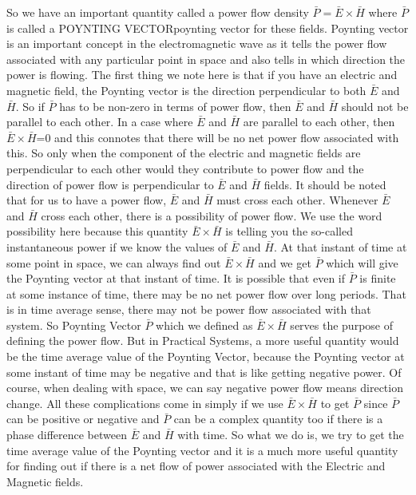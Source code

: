 So we have an important quantity called a power flow density $ \bar{P}=\bar{E}\times\bar{H} $ where $  \bar{P}  $ is called a POYNTING VECTORpoynting vector for these fields. Poynting vector is an important concept in the electromagnetic wave as it tells the power flow associated with any particular point in space and also tells in which direction the power is flowing. The first thing we note here is that if you have an electric and magnetic field, the Poynting vector is the direction perpendicular to both $ \bar{E} $ and  $ \bar{H} $. So if $  \bar{P}  $  has to be non-zero in terms of power flow, then $ \bar{E} $ and  $ \bar{H} $ should not be parallel to each other. In a case where  $ \bar{E} $ and  $ \bar{H} $ are parallel to each other, then  $ \bar{E}\times\bar{H} $=0 and this connotes that there will be no net power flow associated with this. So only when the component of the electric and magnetic fields are perpendicular to each other would they contribute to power flow and the direction of power flow is perpendicular to $ \bar{E} $ and  $ \bar{H} $    fields. It should be noted that for us to have a power flow, $ \bar{E} $ and  $ \bar{H} $  must cross each other. Whenever $ \bar{E} $ and  $ \bar{H} $ cross each other, there is a possibility of power flow. We use the word possibility here because this quantity   $ \bar{E}\times\bar{H} $ is telling you the so-called instantaneous power if we know the values of  $ \bar{E} $ and  $ \bar{H} $. At that instant of time at some point in space, we can always find out $ \bar{E}\times\bar{H} $ and we get $  \bar{P}  $ which will give the Poynting vector at that instant of time. It is possible that even if $  \bar{P}  $ is finite at some instance of time, there may be no net power flow over long periods. That is in time average sense, there may not be power flow associated with that system. So Poynting Vector $  \bar{P}  $ which we defined as $ \bar{E}\times\bar{H} $  serves the purpose of defining the power flow. But in Practical Systems, a more useful quantity would be the time average value of the Poynting Vector, because the Poynting vector at some instant of time may be negative and that is like getting negative power. Of course, when dealing with space, we can say negative power flow means direction change. All these complications come in simply if we use $ \bar{E}\times\bar{H} $ to get  $  \bar{P}  $ since $  \bar{P}  $  can be positive or negative and $  \bar{P}  $  can be a complex quantity too if there is a phase difference between $ \bar{E} $ and  $ \bar{H} $ with time. So what we do is, we try to get the time average value of the Poynting vector and it is a much more useful quantity for finding out if there is a net flow of power associated with the Electric and Magnetic fields. 


